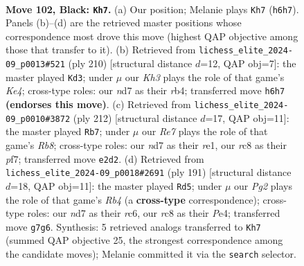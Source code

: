\documentclass[11pt]{article}
\begin{document}
\clearpage

\begin{figure}[p]\centering
\begin{subfigure}{0.46\textwidth}\centering
\resizebox{\linewidth}{!}{%
\newchessgame
\chessboard[
  setfen={2R5/3N2p1/5p1k/7p/7P/6PK/4r3/8 b - - 29 102},
  showmover=false,
  pgfstyle=straightmove, color=movearrow, markmove={h6-h7}
]}
\caption{}
\end{subfigure}\hfill
\begin{subfigure}{0.46\textwidth}\centering
\resizebox{\linewidth}{!}{%
\newchessgame
\chessboard[
  setfen={8/2R5/6pk/7p/1r2K2P/5PP1/8/8 w - - 21 106},
  showmover=false,
  pgfstyle=straightmove, color=movearrow, markmove={e4-d3}
]}
\caption{}
\end{subfigure}
\\[4pt]
\begin{subfigure}{0.46\textwidth}\centering
\resizebox{\linewidth}{!}{%
\newchessgame
\chessboard[
  setfen={1R6/5pk1/6p1/4P2p/5K1P/5PP1/8/4r3 w - - 5 107},
  showmover=false,
  pgfstyle=straightmove, color=movearrow, markmove={b8-b7}
]}
\caption{}
\end{subfigure}\hfill
\begin{subfigure}{0.46\textwidth}\centering
\resizebox{\linewidth}{!}{%
\newchessgame
\chessboard[
  setfen={8/8/2R3p1/1r3k1p/4p2P/6P1/5K2/8 b - - 55 96},
  showmover=false,
  pgfstyle=straightmove, color=movearrow, markmove={b5-d5}
]}
\caption{}
\end{subfigure}
\caption{\textbf{Move 102, Black: \texttt{Kh7}.} (a) Our position; Melanie plays \texttt{Kh7} (\texttt{h6h7}). Panels (b)--(d) are the retrieved master positions whose correspondence most drove this move (highest QAP objective among those that transfer to it). (b) Retrieved from \texttt{lichess\_elite\_2024-09\_p0013\#521} (ply 210) [structural distance $d$=12, QAP obj=7]: the master played \texttt{Kd3}; under $\mu$ our \emph{Kh3} plays the role of that game's \emph{Ke4}; cross-type roles: our \emph{n}d7 as their \emph{r}b4; transferred move \texttt{h6h7} \textbf{(endorses this move)}. (c) Retrieved from \texttt{lichess\_elite\_2024-09\_p0010\#3872} (ply 212) [structural distance $d$=17, QAP obj=11]: the master played \texttt{Rb7}; under $\mu$ our \emph{Re7} plays the role of that game's \emph{Rb8}; cross-type roles: our \emph{n}d7 as their \emph{r}e1, our \emph{r}c8 as their \emph{p}f7; transferred move \texttt{e2d2}. (d) Retrieved from \texttt{lichess\_elite\_2024-09\_p0018\#2691} (ply 191) [structural distance $d$=18, QAP obj=11]: the master played \texttt{Rd5}; under $\mu$ our \emph{Pg2} plays the role of that game's \emph{Rb4} (a \textbf{cross-type} correspondence); cross-type roles: our \emph{n}d7 as their \emph{r}c6, our \emph{r}c8 as their \emph{P}e4; transferred move \texttt{g7g6}. Synthesis: 5 retrieved analogs transferred to \texttt{Kh7} (summed QAP objective 25, the strongest correspondence among the candidate moves); Melanie committed it via the \texttt{search} selector.}
\label{fig:thought-m203}
\end{figure}
\end{document}

